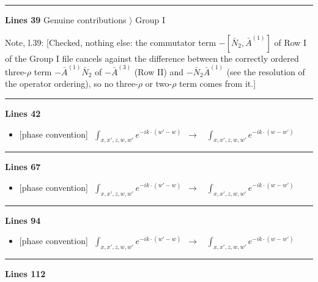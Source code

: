 \documentclass[10pt]{article}
\newenvironment{notebox}{\def\FrameCommand{{\color{notebar}\vrule width 1.5pt}\hspace{6pt}}\MakeFramed{\advance\hsize-\width\FrameRestore}\small}{\endMakeFramed}
\begin{document}
\noindent\rule{\linewidth}{0.3pt}\par\noindent\textbf{Lines 39} \quad \textsf{Genuine contributions $\rangle$ Group I}\par
\begin{notebox}\textsf{\small Note, l.39:} [Checked, nothing else: the commutator term $-[\bar N_{2},\bar A^{(1)}]$ of Row I of the Group I file cancels against the difference between the correctly ordered three-$\rho$ term $-\bar A^{(1)}\bar N_{2}$ of $-\bar A^{(3)}$ (Row II) and $-\bar N_{2}\bar A^{(1)}$ (see the resolution of the operator ordering), so no three-$\rho$ or two-$\rho$ term comes from it.]\end{notebox}
\noindent\rule{\linewidth}{0.3pt}\par\noindent\textbf{Lines 42} \par
\begin{itemize}[leftmargin=2.2em,itemsep=1pt,topsep=2pt]
\item[\textbf{l.42}] \textsf{\small [phase convention]} $\displaystyle \,\, \int_{x,x',z,w,w'}e^{-ik\cdot(w'-w)}$\ $\longrightarrow$\ $\displaystyle \,\, \int_{x,x',z,w,w'}e^{-ik\cdot(w-w')}$
\end{itemize}
\noindent\rule{\linewidth}{0.3pt}\par\noindent\textbf{Lines 67} \par
\begin{itemize}[leftmargin=2.2em,itemsep=1pt,topsep=2pt]
\item[\textbf{l.67}] \textsf{\small [phase convention]} $\displaystyle \,\,\int_{x,x',z,w,w'}e^{-ik\cdot(w'-w)}$\ $\longrightarrow$\ $\displaystyle \,\,\int_{x,x',z,w,w'}e^{-ik\cdot(w-w')}$
\end{itemize}
\noindent\rule{\linewidth}{0.3pt}\par\noindent\textbf{Lines 94} \par
\begin{itemize}[leftmargin=2.2em,itemsep=1pt,topsep=2pt]
\item[\textbf{l.94}] \textsf{\small [phase convention]} $\displaystyle \,\,\int_{x,x',z,w,w'}e^{-ik\cdot(w'-w)}$\ $\longrightarrow$\ $\displaystyle \,\,\int_{x,x',z,w,w'}e^{-ik\cdot(w-w')}$
\end{itemize}
\noindent\rule{\linewidth}{0.3pt}\par\noindent\textbf{Lines 112} \par
\end{document}
